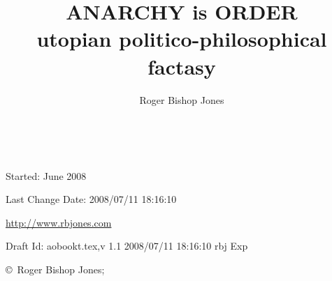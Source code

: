 \documentclass[10pt,titlepage,openany]{book}
\author{Roger Bishop Jones}
\title{ANARCHY is ORDER\\utopian politico-philosophical factasy}
\date{\ }
\begin{document}
\begin{titlepage}
\maketitle

\begin{centering}

{\footnotesize

Started: June 2008

Last Change $ $Date: 2008/07/11 18:16:10 $ $

\href{http://www.rbjones.com/}
{http://www.rbjones.com}

Draft $ $Id: aobookt.tex,v 1.1 2008/07/11 18:16:10 rbj Exp $ $

\copyright\ Roger Bishop Jones;

}%

\end{centering}

\thispagestyle{empty}
\end{titlepage}

{\parskip=0pt\tableofcontents}
\end{document}
